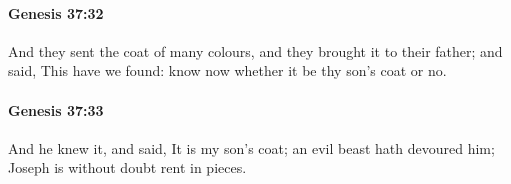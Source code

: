 		\paragraph{Genesis 37:32} %
			\label{GENESIS-37-32}

			And they sent the coat of many colours, and they brought it to their father; and said, This have we found: know now whether it be thy son's coat or no.


		\paragraph{Genesis 37:33} %
			\label{GENESIS-37-33}

			And he knew it, and said, It is my son's coat; an evil beast hath devoured him; Joseph is without doubt rent in pieces.


